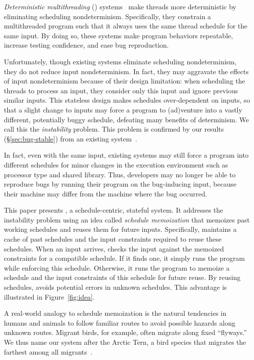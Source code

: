\emph{Deterministic multithreading} (\dmt)
systems~\cite{dmp:asplos09,coredet:asplos10,kendo:asplos09} make threads
more deterministic by eliminating scheduling nondeterminism.
Specifically, they constrain a multithreaded program such that it always
uses the same thread schedule for the same input.  By doing so, these
systems make program behaviors repeatable, increase testing confidence,
and ease bug reproduction.

Unfortunately, though existing \dmt systems eliminate scheduling
nondeterminism, they do not reduce input nondeterminism.  In fact, they
may aggravate the effects of input nondeterminism because of their design
limitation: when scheduling the threads to process an input, they consider
only this input and ignore previous similar inputs.  This stateless design
makes schedules over-dependent on inputs, so that a slight change to
inputs may force a program to (ad)venture into a vastly different,
potentially buggy schedule, defeating many benefits of determinism.  We
call this the \emph{instability} problem. 
This problem is confirmed by our results (\S\ref{sec:bug-stable}) from
an existing \dmt system~\cite{coredet:asplos10}.

In fact, even with the same input, existing \dmt systems may still force a
program into different schedules for minor changes in the execution
environment such as processor type and shared library.  Thus,
developers may no longer be able to reproduce bugs by running their
program on the bug-inducing input, because their machine may differ from
the machine where the bug occurred.

This paper presents \tern, a schedule-centric, stateful \dmt system.  It
addresses the instability problem using an idea called \emph{schedule
  memoization} that memoizes past working schedules and reuses them for
future inputs.  Specifically, \tern maintains a cache of past schedules and
the input constraints required to reuse these schedules.  When an input arrives,
\tern checks the input against the memoized constraints for a compatible
schedule.  If it finds one, it simply runs the program while enforcing
this schedule.  Otherwise, it runs the program to memoize a schedule and
the input constraints of this schedule for future reuse.  By reusing
schedules, \tern avoids potential errors in unknown schedules.  This
advantage is illustrated in Figure~\ref{fig:idea}.

A real-world analogy to schedule memoization is the natural tendencies in
humans and animals to follow familiar routes to avoid possible hazards
along unknown routes.  Migrant birds, for example, often migrate along
fixed ``flyways.''  We thus name our system after the Arctic Tern, a bird
species that migrates the farthest among all migrants~\cite{artic-tern-wiki}.  

